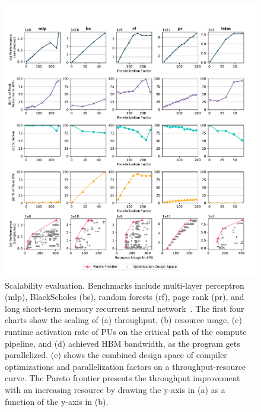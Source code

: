 \begin{figure}
\centering
\includegraphics[width=1\textwidth]{figs/par_thesis.pdf}
\caption[Scalability evaluation]{
  Scalability evaluation. 
  Benchmarks include multi-layer perceptron (mlp), BlackScholes (bs), random forests (rf), page rank
  (pr), and long short-term memory recurrent neural network~\cite{hochreiter1997long}.
  The first four charts show the scaling of
  (a) throughput, 
  (b) resource usage, 
  (c) runtime activation rate of PUs on the critical path of the compute pipeline, 
  and (d) achieved HBM bandwidth, as the program gets parallelized.
  (e) shows the combined design space of compiler optimizations and parallelization factors on a
  throughput-resource curve. 
  The Pareto frontier presents the throughput improvement with an increasing resource by drawing the y-axis in (a) as a function of the y-axis in (b).
}
\label{fig:par}
\end{figure}


